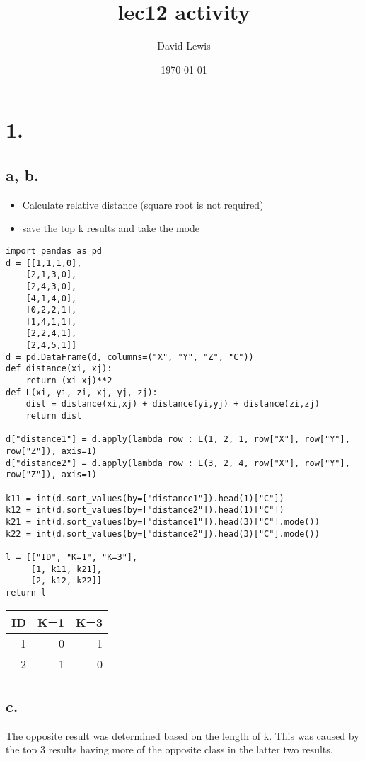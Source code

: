 \documentclass[11pt]{article}
\author{David Lewis}
\date{\today}
\title{lec12 activity}
\begin{document}
\maketitle

\section*{1.}
\label{sec:org281648e}
\subsection*{a, b.}
\label{sec:org70df6bc}
\begin{itemize}
\item Calculate relative distance (square root is not required)
\item save the top k results and take the mode
\end{itemize}
\begin{verbatim}
import pandas as pd
d = [[1,1,1,0],
    [2,1,3,0],
    [2,4,3,0],
    [4,1,4,0],
    [0,2,2,1],
    [1,4,1,1],
    [2,2,4,1],
    [2,4,5,1]]
d = pd.DataFrame(d, columns=("X", "Y", "Z", "C"))
def distance(xi, xj):
    return (xi-xj)**2
def L(xi, yi, zi, xj, yj, zj):
    dist = distance(xi,xj) + distance(yi,yj) + distance(zi,zj)
    return dist

d["distance1"] = d.apply(lambda row : L(1, 2, 1, row["X"], row["Y"], row["Z"]), axis=1)
d["distance2"] = d.apply(lambda row : L(3, 2, 4, row["X"], row["Y"], row["Z"]), axis=1)

k11 = int(d.sort_values(by=["distance1"]).head(1)["C"])
k12 = int(d.sort_values(by=["distance2"]).head(1)["C"])
k21 = int(d.sort_values(by=["distance1"]).head(3)["C"].mode())
k22 = int(d.sort_values(by=["distance2"]).head(3)["C"].mode())

l = [["ID", "K=1", "K=3"],
     [1, k11, k21],
     [2, k12, k22]]
return l
\end{verbatim}

\begin{center}
\begin{tabular}{rrr}
ID & K=1 & K=3\\
\hline
1 & 0 & 1\\
2 & 1 & 0\\
\end{tabular}
\end{center}
\subsection*{c.}
\label{sec:org99357aa}
The opposite result was determined based on the length of k. This was caused by
the top 3 results having more of the opposite class in the latter two results.
\end{document}
